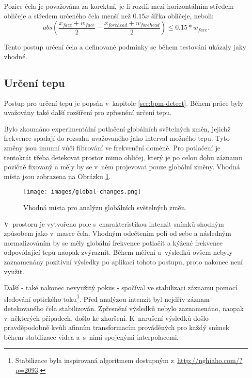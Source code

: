 \documentclass[
  digital, %
  table,   %
%
  lof,     %
  lot,     %
]{fithesis3}
\begin{document}
Pozice čela je považována za korektní, je-li rozdíl mezi horizontálním středem obličeje a středem určeného čela menší než $0.15 x$ šířka obličeje, neboli:
\begin{equation}
abs(\frac{x_{face} + w_{face}}{2} - \frac{x_{forehead} + w_{forehead}}{2}) \leq 0.15 * w_{face}.
\end{equation}

Tento postup určení čela a definované podmínky se během testování ukázaly jaky vhodné.

\subsection{Určení tepu}
\label{sec:pulse-detect}
Postup pro určení tepu je popsán v~kapitole \ref{sec:bpm-detect}. Během práce byly uvažovány také další rozšíření pro zpřesnění určení tepu.

Bylo zkoumáno experimentální potlačení globálních světelných změn, jejichž frekvence spadají do rozsahu uvažovaného jako interval možného tepu. Tyto změny jsou imunní vůči filtrování ve frekvenční doméně. Pro potlačení je tentokrát třeba detekovat prostor mimo obličej, který je po celou dobu záznamu pozičně fixovaný a měly by se v~něm projevovat pouze globální změny. Vhodná místa jsou zobrazena na Obrázku \ref{fig:global-changes}.

\begin{figure}
  \begin{center}
    \texttt{[image: images/global-changes.png]}
  \end{center}
  \caption{Vhodná místa pro analýzu globálních světelných změn.}
  \label{fig:global-changes}
\end{figure}

V~prostoru je vytvořeno pole s~charakteristikou intenzit snímků shodným způsobem jako v~masce čela. Vhodným odečtením polí od sebe a následným normalizováním by se měly globální frekvence potlačit a kýžené frekvence odpovídající tepu naopak zvýraznit. Během měření a~výsledků ovšem nebyly zaznamenány pozitivní výsledky po aplikaci tohoto postupu, proto nakonec není využit.

Další - také nakonec nevyužitý pokus - spočíval ve stabilizaci záznamu pomocí sledování optického toku\footnote{Stabilizace byla inspirovaná algoritmem dostupným z~\url{http://nghiaho.com/?p=2093}.}. Před analýzou intenzit byl nejdřív záznam detekovaného čela stabilizován. Zpřesnění výsledků nebylo zaznamenáno, naopak v~některých případech, došlo ke zhoršení. K~narušení výsledků došlo pravděpodobně kvůli afinním transformacím prováděných pro každý snímek během stabilizace videa a~s~nimi spojenými interpolacemi.
\end{document}

